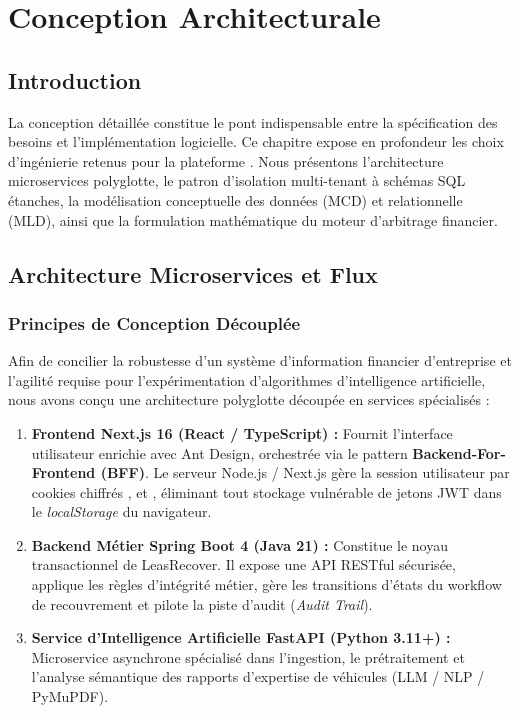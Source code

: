 
\chapter{Conception Architecturale}
\label{chap:conception}

\section{Introduction}

La conception détaillée constitue le pont indispensable entre la spécification des besoins et l'implémentation logicielle. Ce chapitre expose en profondeur les choix d'ingénierie retenus pour la plateforme \textbf{\projectShortTitle}. Nous présentons l'architecture microservices polyglotte, le patron d'isolation multi-tenant à schémas SQL étanches, la modélisation conceptuelle des données (MCD) et relationnelle (MLD), ainsi que la formulation mathématique du moteur d'arbitrage financier.

\section{Architecture Microservices et Flux}

\subsection{Principes de Conception Découplée}

Afin de concilier la robustesse d'un système d'information financier d'entreprise et l'agilité requise pour l'expérimentation d'algorithmes d'intelligence artificielle, nous avons conçu une architecture polyglotte découpée en services spécialisés :

\begin{enumerate}
    \item \textbf{Frontend Next.js 16 (React / TypeScript) :} Fournit l'interface utilisateur enrichie avec Ant Design, orchestrée via le pattern \textbf{Backend-For-Frontend (BFF)}. Le serveur Node.js / Next.js gère la session utilisateur par cookies chiffrés ,  et , éliminant tout stockage vulnérable de jetons JWT dans le \textit{localStorage} du navigateur.
    \item \textbf{Backend Métier Spring Boot 4 (Java 21) :} Constitue le noyau transactionnel de LeasRecover. Il expose une API RESTful sécurisée, applique les règles d'intégrité métier, gère les transitions d'états du workflow de recouvrement et pilote la piste d'audit (\textit{Audit Trail}).
    \item \textbf{Service d'Intelligence Artificielle FastAPI (Python 3.11+) :} Microservice asynchrone spécialisé dans l'ingestion, le prétraitement et l'analyse sémantique des rapports d'expertise de véhicules (LLM / NLP / PyMuPDF).
\end{enumerate}

